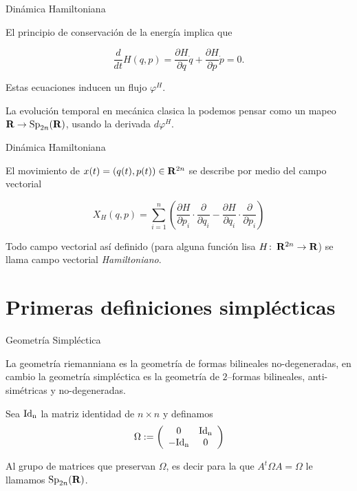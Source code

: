 \documentclass{beamer}
\def\R\re
\def \R{{\bf R}}
\def \re{{\mathbb R}}
\def\co{\colon\thinspace}
\begin{document}
\begin{frame}{Dinámica Hamiltoniana}

El principio de conservaci\'on de la energ\'ia implica que 

$$  \frac{d}{dt}H(q,p)=\frac{\partial H}{\partial q}\dot{q}+\frac{\partial H}{\partial p}\dot{p}=0.$$
\pause

Estas ecuaciones inducen un flujo $\varphi^{H}$. %
\pause

La evoluci\'on temporal en mec\'anica clasica la podemos pensar como un mapeo $\R \to {\rm Sp}_{2n}(\R)$, usando la derivada $d\varphi^{H}$. %

\end{frame}

\begin{frame}{Dinámica Hamiltoniana}

El movimiento de $x(t)=( q(t),p(t))\in \R^{2n}$ se describe por medio del campo vectorial

$$X_{H}(q,p)= \sum\limits_{i=1}^{n}\left( \frac{\partial H}{\partial p_{i}}\cdot \frac{\partial }{\partial q_{i}}- \frac{\partial H}{\partial q_{i}}\cdot \frac{\partial }{\partial p_{i}} \right)$$

\pause

Todo campo vectorial as\'i definido (para alguna funci\'on lisa $H\co \R^{2n}\to \R$) se llama campo vectorial {\it Hamiltoniano}.

\end{frame}

\section{Primeras definiciones simplécticas}
\begin{frame}{Geometría Simpléctica}

La geometr\'ia riemanniana es la geometr\'ia de formas bilineales no-degeneradas, en cambio la geometr\'ia simpléctica es la geometr\'ia de $2$--formas bilineales, anti-sim\'etricas y no-degeneradas.
\pause


Sea ${\rm Id_{n}}$ la matriz identidad de $n\times n$ y definamos
$$\Omega:=\left (  \begin{array}{cc} 0 & {\rm Id_{n}} \\ -{\rm Id_{n}} & 0 \end{array} \right)$$ 

\pause

Al grupo de matrices que preservan $\Omega$, es decir para la que $A^{t}\Omega A =\Omega$ le llamamos ${\rm Sp}_{2n}(\R)$.


\end{frame}
\end{document}
